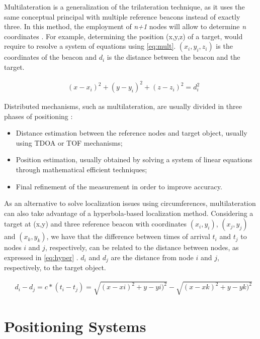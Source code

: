 Multilateration is a generalization of the trilateration technique, as it uses the same conceptual principal with multiple reference beacons instead of exactly three. In this method, the employment of \textit{n+1} nodes will allow to determine \textit{n} coordinates \cite{arch_localiz}. For example, determining the position (x,y,z) of a target, would require to resolve a system of equations using \ref{eq:mult}. $(x_{i}, y_{i}, z_{i})$ is the coordinates of the beacon and $d_{i}$ is the distance between the beacon and the target.

\begin{eqnarray}
& (x - x_{i})^2 + (y - y_{i})^2 + (z - z_{i})^2 = d_{i}^2 
\label{eq:mult}
\end{eqnarray}

Distributed mechanisms, such as multilateration, are usually divided in three phases of positioning \cite{suvey-loc}:
\begin{itemize}
	\item Distance estimation between the reference nodes and target object, usually using TDOA or TOF mechanisms;
	\item Position estimation, usually obtained by solving a system of linear equations through mathematical efficient techniques;
	\item Final refinement of the measurement in order to improve accuracy.
\end{itemize}

As an alternative to solve localization issues using circumferences, multilateration can also take advantage of a hyperbola-based localization method. Considering a target at (x,y) and three reference beacon with coordinates $(x_{i},y_{i})$,  $(x_{j},y_{j})$ and  $(x_{k},y_{k})$, we have that the difference between times of arrival $t_{i}$ and $t_{j}$ to nodes $i$ and $j$, respectively, can be related to the distance between nodes, as expressed in \ref{eq:hyper} \cite{arch_localiz}. $d_{i}$ and $d_{j}$ are the distance from node $i$ and $j$, respectively, to the target object. 

\begin{eqnarray}
& d_{i} - d_{j} = c * (t_{i} - t_{j}) = \sqrt{(x - x{i})^2 + y - y{i})^2} - \sqrt{(x - x{k})^2 + y - y{k})^2}
\label{eq:hyper}
\end{eqnarray}


\section{Positioning Systems}

